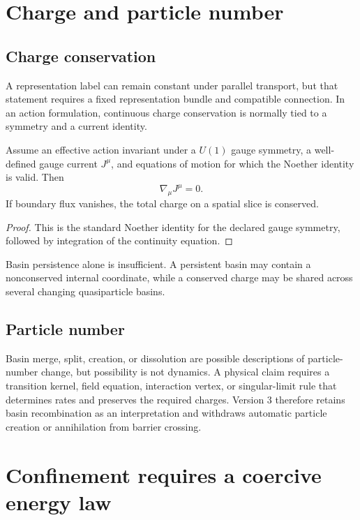 \documentclass[11pt]{article}
\begin{document}
\section{Charge and particle number}

\subsection{Charge conservation}

A representation label can remain constant under parallel transport, but
that statement requires a fixed representation bundle and compatible
connection.  In an action formulation, continuous charge conservation is
normally tied to a symmetry and a current identity.

\begin{theorem}\label{thm:charge}
Assume an effective action invariant under a $U(1)$ gauge symmetry, a
well-defined gauge current $J^\mu$, and equations of motion for which the
Noether identity is valid.  Then
\[
 \nabla_\mu J^\mu=0.
\]
If boundary flux vanishes, the total charge on a spatial slice is conserved.
\end{theorem}

\begin{proof}
This is the standard Noether identity for the declared gauge symmetry,
followed by integration of the continuity equation.
\end{proof}

Basin persistence alone is insufficient.  A persistent basin may contain a
nonconserved internal coordinate, while a conserved charge may be shared
across several changing quasiparticle basins.

\subsection{Particle number}

Basin merge, split, creation, or dissolution are possible descriptions of
particle-number change, but possibility is not dynamics.  A physical claim
requires a transition kernel, field equation, interaction vertex, or
singular-limit rule that determines rates and preserves the required charges.
Version 3 therefore retains basin recombination as an interpretation and
withdraws automatic particle creation or annihilation from barrier crossing.

\section{Confinement requires a coercive energy law}
\end{document}

